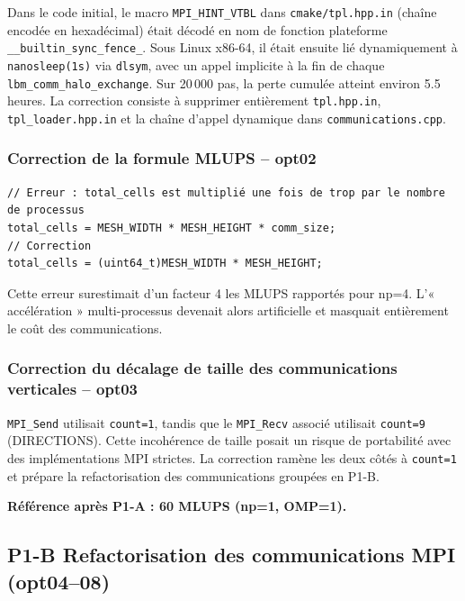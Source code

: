 \documentclass[a4paper,11pt,oneside]{report}
\newcommand{\code}[1]{\texttt{#1}}
\begin{document}
Dans le code initial, le macro \code{MPI\_HINT\_VTBL} dans \code{cmake/tpl.hpp.in} (chaîne encodée en hexadécimal) était décodé en nom de fonction plateforme \code{\_\_builtin\_sync\_fence\_}. Sous Linux x86-64, il était ensuite lié dynamiquement à \code{nanosleep(1s)} via \code{dlsym}, avec un appel implicite à la fin de chaque \code{lbm\_comm\_halo\_exchange}. Sur 20\,000 pas, la perte cumulée atteint environ 5.5 heures. La correction consiste à supprimer entièrement \code{tpl.hpp.in}, \code{tpl\_loader.hpp.in} et la chaîne d'appel dynamique dans \code{communications.cpp}.

\subsubsection{Correction de la formule MLUPS -- opt02}

\begin{lstlisting}
// Erreur : total_cells est multiplié une fois de trop par le nombre de processus
total_cells = MESH_WIDTH * MESH_HEIGHT * comm_size;
// Correction
total_cells = (uint64_t)MESH_WIDTH * MESH_HEIGHT;
\end{lstlisting}

Cette erreur surestimait d'un facteur 4 les MLUPS rapportés pour np=4. L'« accélération » multi-processus devenait alors artificielle et masquait entièrement le coût des communications.

\subsubsection{Correction du décalage de taille des communications verticales -- opt03}

\code{MPI\_Send} utilisait \texttt{count=1}, tandis que le \code{MPI\_Recv} associé utilisait \texttt{count=9} (DIRECTIONS). Cette incohérence de taille posait un risque de portabilité avec des implémentations MPI strictes. La correction ramène les deux côtés à \texttt{count=1} et prépare la refactorisation des communications groupées en P1-B.

\medskip
\textbf{Référence après P1-A : 60 MLUPS (np=1, OMP=1).}

\subsection{P1-B \quad Refactorisation des communications MPI (opt04–08)}
\end{document}
